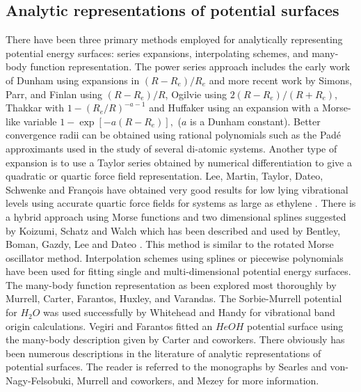 \subsection{Analytic representations of potential surfaces}

There have been three primary methods employed for analytically representing
potential energy surfaces: series expansions, interpolating schemes, and
many-body function representation. The power series approach includes the
early work of Dunham\cite{Dunham32a,Dunham32b} using expansions in $%
(R-R_e)/R_e$ and more recent work by Simons, Parr, and Finlan\cite{Simons73}
using $(R-R_e)/R$, Ogilvie\cite{Ogilvie81} using $2\left( R-R_e\right)
/\left( R+R_e\right) $, Thakkar\cite{Thakkar75} with $1-(R_e/R)^{-a-1}$ and
Huffaker\cite{Huffaker76} using an expansion with a Morse\cite{Morse29}-like
variable $1-\exp \left[ -a\left( R-R_e\right) \right] ,$ ($a$ is a Dunham
constant). Better convergence radii can be obtained using rational
polynomials such as the Pad\'{e} approximants used in the study of several
di-atomic systems\cite{Jordan74,Jorish79,Sonnleitner81,Pardo86}. Another
type of expansion is to use a Taylor series obtained by numerical
differentiation to give a quadratic or quartic force field representation.
Lee, Martin, Taylor, Dateo, Schwenke and Fran\c{c}ois have obtained very
good results for low lying vibrational levels using accurate quartic force
fields\cite{Lee95a,Dateo94,Martin93,Lee95b} for systems as large as ethylene%
\cite{Martin95}. There is a hybrid approach using Morse functions and two
dimensional splines suggested by Koizumi, Schatz and Walch\cite{Koizumi91}
which has been described and used by Bentley, Boman, Gazdy, Lee and Dateo%
\cite{Bentley92}. This method is similar to the rotated Morse oscillator
method\cite{Bowman75,Connor75}. Interpolation schemes using splines or
piecewise polynomials have been used for fitting single and
multi-dimensional potential energy surfaces\cite
{Forsythe77,Malik80,Sathyamurthy75,Dunne87,Bruehl88}. The many-body function
representation as been explored most thoroughly by Murrell, Carter,
Farantos, Huxley, and Varandas\cite{Murrell84}. The Sorbie-Murrell\cite
{Sorbie75} potential for $H_2O$ was used successfully by Whitehead and Handy%
\cite{Whitehead76} for vibrational band origin calculations. Vegiri and
Farantos\cite{Vergiri88} fitted an $HeOH$ potential surface using the
many-body description given by Carter and coworkers\cite{Carter82}. There
obviously has been numerous descriptions in the literature of analytic
representations of potential surfaces. The reader is referred to the
monographs by Searles and von-Nagy-Felsobuki\cite{Searles93}, Murrell and
coworkers\cite{Murrell84}, and Mezey\cite{Mezey87} for more information.

